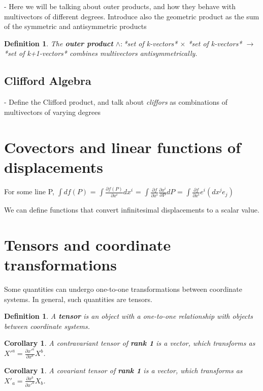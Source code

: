 \documentclass{book}
\newtheorem{defn}[equation]{Definition}
\newtheorem{coro}[equation]{Corollary}
\begin{document}
- Here we will be talking about outer products, and how they behave with multivectors of different degrees. Introduce also the geometric product as the sum of the symmetric and antisymmetric products

\begin{defn}
	
	The \textbf{outer product} $\wedge : $*set of k-vectors* $\times$ *set of k-vectors* $\to$ *set of k+1-vectors* combines multivectors antisymmetrically. 
\end{defn}

\subsection{Clifford Algebra}

- Define the Clifford product, and talk about \emph{cliffors} as combinations of multivectors of varying degrees 


\section{Covectors and linear functions of displacements}

For some line P, $\int df(P)$ = $\int \frac{\partial f(P)}{{\partial x^i}} dx^i$ = $\int \frac{\partial f}{\partial x^i}\frac{\partial x^i}{\partial P}dP$ = $\int \frac{{\partial f}}{{\partial x^i}} e^i (dx^j e_j)$

We can define functions that convert infinitesimal displacements to a scalar value. 




\section{Tensors and coordinate transformations}
Some quantities can undergo one-to-one transformations between coordinate systems. In general, such quantities are tensors. 


\begin{defn}
	A \textbf{tensor} is an object with a one-to-one relationship with objects between coordinate systems. 
\end{defn}

\begin{coro}
	A contravariant tensor of \textbf{rank 1} is a vector, which transforms as  $X'^a = \frac{\partial x'^a}{\partial x^b} X^b$.  
\end{coro}

\begin{coro}
	A covariant tensor of \textbf{rank 1} is a vector, which transforms as $X'_a = \frac{\partial x^b}{\partial x'^a} X_b$. 
\end{coro}
\end{document}
